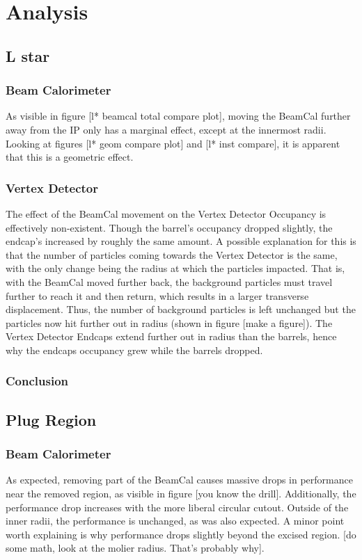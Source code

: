 \documentclass{report}
\begin{document}
    \chapter{Analysis}
        \section{L star}
            \subsection{Beam Calorimeter}
                As visible in figure [l* beamcal total compare plot], moving the BeamCal further away from the IP only has a marginal effect, except at the innermost radii. Looking at figures [l* geom compare plot] and [l* inst compare], it is apparent that this is a geometric effect.
                
            \subsection{Vertex Detector} 
                The effect of the BeamCal movement on the Vertex Detector Occupancy is effectively non-existent. Though the barrel's occupancy dropped slightly, the endcap's increased by roughly the same amount. A possible explanation for this is that the number of particles coming towards the Vertex Detector is the same, with the only change being the radius at which the particles impacted. That is, with the BeamCal moved further back, the background particles must travel further to reach it and then return, which results in a larger transverse displacement. Thus, the number of background particles is left unchanged but the particles now hit further out in radius (shown in figure [make a figure]). The Vertex Detector Endcaps extend further out in radius than the barrels, hence why the endcaps occupancy grew while the barrels dropped.

            \subsection{Conclusion}


        \section{Plug Region}
            \subsection{Beam Calorimeter}
                As expected, removing part of the BeamCal causes massive drops in performance near the removed region, as visible in figure [you know the drill]. Additionally, the performance drop increases with the more liberal circular cutout. Outside of the inner radii, the performance is unchanged, as was also expected. A minor point worth explaining is why performance drops slightly beyond the excised region. [do some math, look at the molier radius. That's probably why].
                
\end{document}
